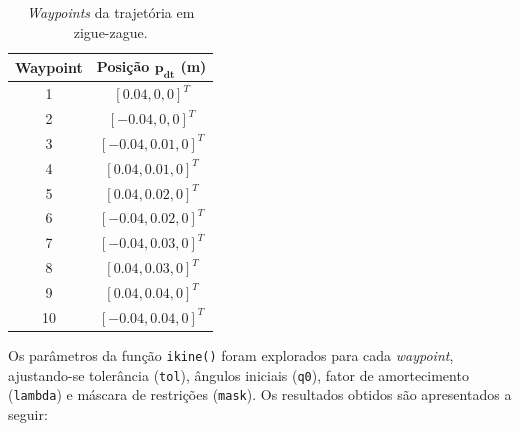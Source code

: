 \documentclass[10pt]{article}
\begin{document}
\begin{table}[h!]
    \centering
    \begin{tabular}{|c|c|}
    \hline
    \textbf{Waypoint} & \textbf{Posição $\boldsymbol{p_{dt}}$ (m)} \\ \hline
    1                 & $[0.04, 0, 0]^T$                          \\ \hline
    2                 & $[-0.04, 0, 0]^T$                         \\ \hline
    3                 & $[-0.04, 0.01, 0]^T$                      \\ \hline
    4                 & $[0.04, 0.01, 0]^T$                       \\ \hline
    5                 & $[0.04, 0.02, 0]^T$                       \\ \hline
    6                 & $[-0.04, 0.02, 0]^T$                      \\ \hline
    7                 & $[-0.04, 0.03, 0]^T$                      \\ \hline
    8                 & $[0.04, 0.03, 0]^T$                       \\ \hline
    9                 & $[0.04, 0.04, 0]^T$                       \\ \hline
    10                & $[-0.04, 0.04, 0]^T$                      \\ \hline
    \end{tabular}
    \caption{\textit{Waypoints} da trajetória em zigue-zague.}
    \label{tab:waypoints}
\end{table}

\quad Os parâmetros da função \texttt{ikine()} foram explorados para cada \textit{waypoint}, ajustando-se tolerância (\texttt{tol}), ângulos iniciais (\texttt{q0}), fator de amortecimento (\texttt{lambda}) e máscara de restrições (\texttt{mask}). Os resultados obtidos são apresentados a seguir:
\end{document}
